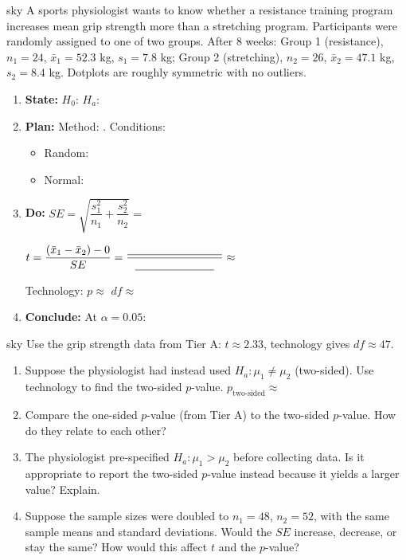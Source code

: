 \documentclass[10pt]{article}
\begin{document}
\begin{scenariobox}{sky}
A sports physiologist wants to know whether a resistance training program increases mean
grip strength more than a stretching program. Participants were randomly assigned to one
of two groups. After 8 weeks: Group 1 (resistance), $n_1 = 24$, $\bar x_1 = 52.3$ kg,
$s_1 = 7.8$ kg; Group 2 (stretching), $n_2 = 26$, $\bar x_2 = 47.1$ kg, $s_2 = 8.4$ kg.
Dotplots are roughly symmetric with no outliers.

\begin{enumerate}[label=\alph*.]
  \item \textbf{State:} $H_0$: \blank{4cm} \quad $H_a$: \blank{4cm}
  \item \textbf{Plan:} Method: \blank{5cm}. Conditions:
        \begin{itemize}
          \item Random: \writeline
          \item Normal: \writeline
        \end{itemize}
  \item \textbf{Do:} $SE = \sqrt{\dfrac{s_1^2}{n_1} + \dfrac{s_2^2}{n_2}} = $ \blank{3.5cm}

        $t = \dfrac{(\bar x_1 - \bar x_2) - 0}{SE} = \dfrac{\blank{3cm}}{\blank{2.5cm}} \approx$ \blank{2cm}

        Technology: $p \approx$ \blank{2cm} \quad $df \approx$ \blank{2cm}

  \item \textbf{Conclude:} At $\alpha = 0.05$: 
\end{enumerate}
\end{scenariobox}

\begin{scenariobox}{sky}
Use the grip strength data from Tier A: $t \approx 2.33$, technology gives $df \approx 47$.

\begin{enumerate}[label=\alph*.]
  \item Suppose the physiologist had instead used $H_a: \mu_1 \ne \mu_2$ (two-sided).
        Use technology to find the two-sided $p$-value. \quad $p_{\text{two-sided}} \approx$ \blank{2cm}

  \item Compare the one-sided $p$-value (from Tier A) to the two-sided $p$-value.
        How do they relate to each other? \writeline

  \item The physiologist pre-specified $H_a: \mu_1 > \mu_2$ before collecting data.
        Is it appropriate to report the two-sided $p$-value instead because it yields
        a larger value? Explain. 

  \item Suppose the sample sizes were doubled to $n_1 = 48$, $n_2 = 52$, with the same
        sample means and standard deviations. Would the $SE$ increase, decrease, or stay
        the same? How would this affect $t$ and the $p$-value? 
\end{enumerate}
\end{scenariobox}
\end{document}
